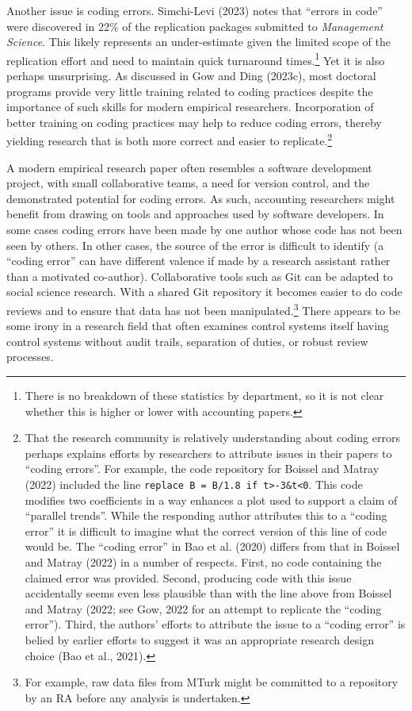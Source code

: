 \documentclass[
  letterpaper,
  DIV=11,
  numbers=noendperiod]{scrartcl}
\begin{document}
Another issue is coding errors. Simchi-Levi (2023) notes that ``errors
in code'' were discovered in 22\% of the replication packages submitted
to \emph{Management Science}. This likely represents an under-estimate
given the limited scope of the replication effort and need to maintain
quick turnaround times.\footnote{There is no breakdown of these
  statistics by department, so it is not clear whether this is higher or
  lower with accounting papers.} Yet it is also perhaps unsurprising. As
discussed in Gow and Ding (2023c), most doctoral programs provide very
little training related to coding practices despite the importance of
such skills for modern empirical researchers. Incorporation of better
training on coding practices may help to reduce coding errors, thereby
yielding research that is both more correct and easier to
replicate.\footnote{That the research community is relatively
  understanding about coding errors perhaps explains efforts by
  researchers to attribute issues in their papers to ``coding errors''.
  For example, the code repository for Boissel and Matray (2022)
  included the line
  \texttt{replace\ B\ =\ B/1.8\ if\ t\textgreater{}-3\&t\textless{}0}.
  This code modifies two coefficients in a way enhances a plot used to
  support a claim of ``parallel trends''. While the responding author
  attributes this to a ``coding error'' it is difficult to imagine what
  the correct version of this line of code would be. The ``coding
  error'' in Bao et al. (2020) differs from that in Boissel and Matray
  (2022) in a number of respects. First, no code containing the claimed
  error was provided. Second, producing code with this issue
  accidentally seems even less plausible than with the line above from
  Boissel and Matray (2022; see Gow, 2022 for an attempt to replicate
  the ``coding error''). Third, the authors' efforts to attribute the
  issue to a ``coding error'' is belied by earlier efforts to suggest it
  was an appropriate research design choice (Bao et al., 2021).}

A modern empirical research paper often resembles a software development
project, with small collaborative teams, a need for version control, and
the demonstrated potential for coding errors. As such, accounting
researchers might benefit from drawing on tools and approaches used by
software developers. In some cases coding errors have been made by one
author whose code has not been seen by others. In other cases, the
source of the error is difficult to identify (a ``coding error'' can
have different valence if made by a research assistant rather than a
motivated co-author). Collaborative tools such as Git can be adapted to
social science research. With a shared Git repository it becomes easier
to do code reviews and to ensure that data has not been
manipulated.\footnote{For example, raw data files from MTurk might be
  committed to a repository by an RA before any analysis is undertaken.}
There appears to be some irony in a research field that often examines
control systems itself having control systems without audit trails,
separation of duties, or robust review processes.
\end{document}
